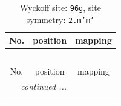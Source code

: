 \documentclass[fleqn,8pt]{jsarticle}
\begin{document}
\renewcommand{\arraystretch}{1.2}
\begin{longtable}{ccc}
\caption{Wyckoff site: {\tt 96g}, site symmetry: {\tt 2.m'm'}}
 \\
 \hline \hline
No. & position & mapping \\ \hline \endfirsthead

\multicolumn{2}{l}{\tablename\ \thetable{}} \\
 \hline \hline
No. & position & mapping \\ \hline \endhead

 \hline \hline
\multicolumn{2}{r}{\footnotesize\it continued ...} \\ \endfoot

 \hline \hline
\multicolumn{2}{r}{} \\ \endlastfoot


\end{longtable}
\end{document}
